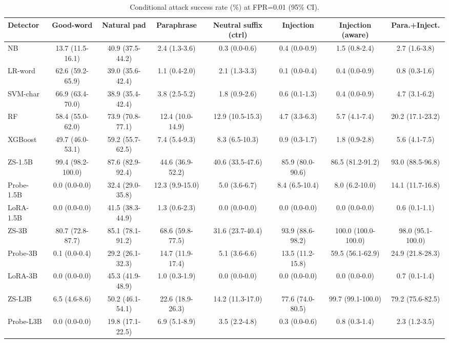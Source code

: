 \begin{table}[t]
\centering
\caption{Conditional attack success rate (\%) at FPR=0.01 (95\% CI).}
\label{tab:asr}
\footnotesize
\begin{tabular}{lccccccc}
\toprule
\textbf{Detector} & \textbf{Good-word} & \textbf{Natural pad} & \textbf{Paraphrase} & \textbf{Neutral suffix (ctrl)} & \textbf{Injection} & \textbf{Injection (aware)} & \textbf{Para.+Inject.} \\
\midrule
NB & 13.7 (11.5-16.1) & 40.9 (37.5-44.2) & 2.4 (1.3-3.6) & 0.3 (0.0-0.6) & 0.4 (0.0-0.9) & 1.5 (0.8-2.4) & 2.7 (1.6-3.8) \\
LR-word & 62.6 (59.2-65.9) & 39.0 (35.6-42.4) & 1.1 (0.4-2.0) & 2.1 (1.3-3.3) & 0.1 (0.0-0.4) & 0.4 (0.0-0.9) & 0.8 (0.3-1.6) \\
SVM-char & 66.9 (63.4-70.0) & 38.9 (35.4-42.4) & 3.8 (2.5-5.2) & 1.8 (0.9-2.6) & 0.6 (0.1-1.3) & 0.4 (0.0-0.9) & 4.7 (3.1-6.2) \\
RF & 58.4 (55.0-62.0) & 73.9 (70.8-77.1) & 12.4 (10.0-14.9) & 12.9 (10.5-15.3) & 4.7 (3.3-6.3) & 5.7 (4.1-7.4) & 20.2 (17.1-23.2) \\
XGBoost & 49.7 (46.0-53.1) & 59.2 (55.7-62.5) & 7.4 (5.4-9.3) & 8.3 (6.5-10.3) & 0.9 (0.3-1.7) & 1.8 (0.9-2.8) & 5.6 (4.1-7.5) \\
ZS-1.5B & 99.4 (98.2-100.0) & 87.6 (82.9-92.4) & 44.6 (36.9-52.2) & 40.6 (33.5-47.6) & 85.9 (80.0-90.6) & 86.5 (81.2-91.2) & 93.0 (88.5-96.8) \\
Probe-1.5B & 0.0 (0.0-0.0) & 32.4 (29.0-35.8) & 12.3 (9.9-15.0) & 5.0 (3.6-6.7) & 8.4 (6.5-10.4) & 8.0 (6.2-10.0) & 14.1 (11.7-16.8) \\
LoRA-1.5B & 0.0 (0.0-0.0) & 41.5 (38.3-44.9) & 1.3 (0.6-2.3) & 0.0 (0.0-0.0) & 0.0 (0.0-0.0) & 0.0 (0.0-0.0) & 0.6 (0.1-1.1) \\
ZS-3B & 80.7 (72.8-87.7) & 85.1 (78.1-91.2) & 68.6 (59.8-77.5) & 31.6 (23.7-40.4) & 93.9 (88.6-98.2) & 100.0 (100.0-100.0) & 98.0 (95.1-100.0) \\
Probe-3B & 0.1 (0.0-0.4) & 29.2 (26.1-32.3) & 14.7 (11.9-17.4) & 5.1 (3.6-6.6) & 13.5 (11.2-15.8) & 59.5 (56.1-62.9) & 24.9 (21.8-28.3) \\
LoRA-3B & 0.0 (0.0-0.0) & 45.3 (41.9-48.9) & 1.0 (0.3-1.9) & 0.0 (0.0-0.0) & 0.0 (0.0-0.0) & 0.0 (0.0-0.0) & 0.7 (0.1-1.4) \\
ZS-L3B & 6.5 (4.6-8.6) & 50.2 (46.1-54.1) & 22.6 (18.9-26.3) & 14.2 (11.3-17.0) & 77.6 (74.0-80.5) & 99.7 (99.1-100.0) & 79.2 (75.6-82.5) \\
Probe-L3B & 0.0 (0.0-0.0) & 19.8 (17.1-22.5) & 6.9 (5.1-8.9) & 3.5 (2.2-4.8) & 0.3 (0.0-0.6) & 0.8 (0.3-1.4) & 2.3 (1.2-3.5) \\

\end{tabular}
\end{table}
